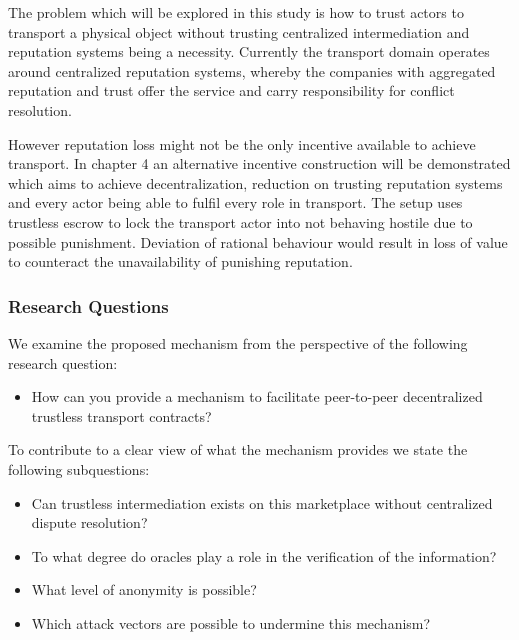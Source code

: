 The problem which will be explored in this study is how to trust actors to transport a physical object without trusting centralized intermediation and reputation systems being a necessity. Currently the transport domain operates around centralized reputation systems, whereby the companies with aggregated reputation and trust offer the service and carry responsibility for conflict resolution.\par
However reputation loss might not be the only incentive available to achieve transport. In chapter 4 an alternative incentive construction will be demonstrated which aims to achieve decentralization, reduction on trusting reputation systems and every actor being able to fulfil every role in transport. The setup uses trustless escrow to lock the transport actor into not behaving hostile due to possible punishment. Deviation of rational behaviour would result in loss of value to counteract the unavailability of punishing reputation.

\subsubsection{Research Questions}

\bigbreak
\noindent We examine the proposed mechanism from the perspective of the following research question:
\begin{itemize}
  \item How can you provide a mechanism to facilitate peer-to-peer decentralized trustless transport contracts?
\end{itemize}
\bigbreak
\noindent To contribute to a clear view of what the mechanism provides we state the following subquestions:
\bigbreak
\begin{itemize}
  \item Can trustless intermediation exists on this marketplace without centralized dispute resolution?
  \item To what degree do oracles play a role in the verification of the information?
  \item What level of anonymity is possible?
  \item Which attack vectors are possible to undermine this mechanism?
\end{itemize}

